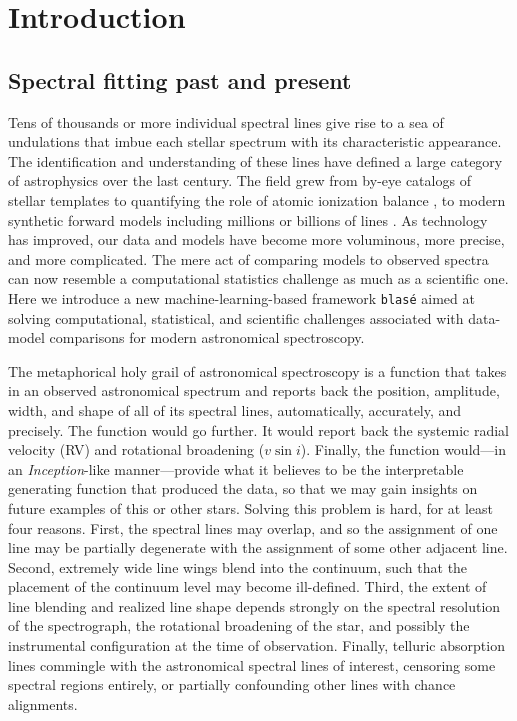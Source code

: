 \documentclass[modern]{aastex631}
\begin{document}

\section{Introduction}\label{sec:intro}

\subsection{Spectral fitting past and present}

Tens of thousands or more individual spectral lines give rise to a sea of undulations that imbue each stellar spectrum with its characteristic appearance.  The identification and understanding of these lines have defined a large category of astrophysics over the last century.  The field grew from by-eye catalogs of stellar templates \citep{1901AnHar..28..129C} to quantifying the role of atomic ionization balance \citep{1925PhDT.........1P}, to modern synthetic forward models including millions or billions of lines \citep{husser13, 2021ApJ...920...85M}.  As technology has improved, our data and models have become more voluminous, more precise, and more complicated.  The mere act of comparing models to observed spectra can now resemble a computational statistics challenge as much as a scientific one.  Here we introduce a new machine-learning-based framework \texttt{blas\'e} aimed at solving computational, statistical, and scientific challenges associated with data-model comparisons for modern astronomical spectroscopy.

The metaphorical holy grail of astronomical spectroscopy is a function that takes in an observed astronomical spectrum and reports back the position, amplitude, width, and shape of all of its spectral lines, automatically, accurately, and precisely.  The function would go further. It would report back the systemic radial velocity (RV) and rotational broadening ($v\sin{i}$).  Finally, the function would---in an \emph{Inception}-like manner---provide what it believes to be the interpretable generating function that produced the data, so that we may gain insights on future examples of this or other stars.  Solving this problem is hard, for at least four reasons.  First, the spectral lines may overlap, and so the assignment of one line may be partially degenerate with the assignment of some other adjacent line.  Second, extremely wide line wings blend into the continuum, such that the placement of the continuum level may become ill-defined.  Third, the extent of line blending and realized line shape depends strongly on the spectral resolution of the spectrograph, the rotational broadening of the star, and possibly the instrumental configuration at the time of observation.  Finally, telluric absorption lines commingle with the astronomical spectral lines of interest, censoring some spectral regions entirely, or partially confounding other lines with chance alignments.
\end{document}
